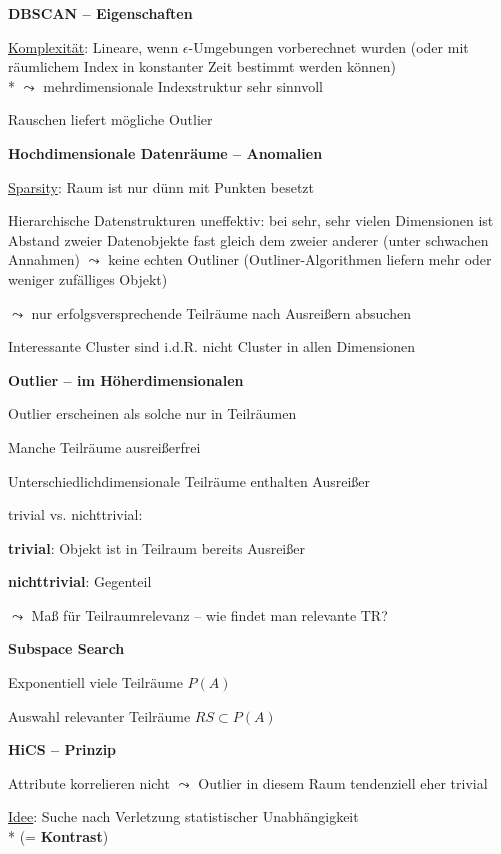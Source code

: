 \textbf{DBSCAN -- Eigenschaften}
\begin{items}
	\item \underline{Komplexität}: Lineare, wenn \( \epsilon \)-Umgebungen vorberechnet wurden (oder mit räumlichem Index in konstanter Zeit bestimmt werden können) \\* \( \leadsto \) mehrdimensionale Indexstruktur sehr sinnvoll
	\item Rauschen liefert mögliche Outlier
\end{items}

\textbf{Hochdimensionale Datenräume -- Anomalien}
\begin{items}
	\item \underline{Sparsity}: Raum ist nur dünn mit Punkten besetzt
	\item Hierarchische Datenstrukturen uneffektiv: bei sehr, sehr vielen Dimensionen ist Abstand zweier Datenobjekte fast gleich dem zweier anderer (unter schwachen Annahmen) \( \leadsto \) keine echten Outliner (Outliner-Algorithmen liefern mehr oder weniger zufälliges Objekt)
	\item \( \leadsto \) nur erfolgsversprechende Teilräume nach Ausreißern absuchen
	\item Interessante Cluster sind i.d.R. nicht Cluster in allen Dimensionen
\end{items}

\textbf{Outlier -- im Höherdimensionalen}
\begin{items}
	\item Outlier erscheinen als solche nur in Teilräumen
	\item Manche Teilräume ausreißerfrei
	\item Unterschiedlichdimensionale Teilräume enthalten Ausreißer
	\item trivial vs. nichttrivial:
	\begin{enumeration}
		\item \textbf{trivial}: Objekt ist in Teilraum bereits Ausreißer
		\item \textbf{nichttrivial}: Gegenteil
	\end{enumeration}
	\item \( \leadsto \) Maß für Teilraumrelevanz -- wie findet man relevante TR?
\end{items}

\textbf{Subspace Search}
\begin{items}
	\item Exponentiell viele Teilräume \( P(A) \)
	\item Auswahl relevanter Teilräume \( RS \subset P(A) \)
\end{items}

\textbf{HiCS -- Prinzip}
\begin{items}
	\item Attribute korrelieren nicht \( \leadsto \) Outlier in diesem Raum tendenziell eher trivial
	\item \underline{Idee}: Suche nach Verletzung statistischer Unabhängigkeit \\* (= \textbf{Kontrast})
\end{items}